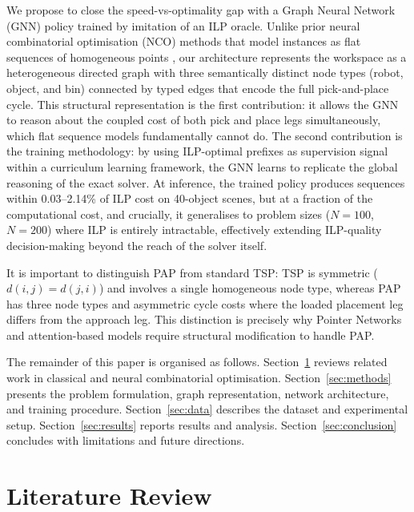 \documentclass[conference]{IEEEtran}
\begin{document}
We propose to close the speed-vs-optimality gap with a Graph Neural Network (GNN) policy trained by imitation of an ILP oracle. Unlike prior neural combinatorial optimisation (NCO) methods that model instances as flat sequences of homogeneous points \cite{vinyals2015pointer, kool2019attention}, our architecture represents the workspace as a heterogeneous directed graph with three semantically distinct node types (robot, object, and bin) connected by typed edges that encode the full pick-and-place cycle. This structural representation is the first contribution: it allows the GNN to reason about the coupled cost of both pick and place legs simultaneously, which flat sequence models fundamentally cannot do. The second contribution is the training methodology: by using ILP-optimal prefixes as supervision signal within a curriculum learning framework, the GNN learns to replicate the global reasoning of the exact solver. At inference, the trained policy produces sequences within 0.03--2.14\% of ILP cost on 40-object scenes, but at a fraction of the computational cost, and crucially, it generalises to problem sizes ($N{=}100$, $N{=}200$) where ILP is entirely intractable, effectively extending ILP-quality decision-making beyond the reach of the solver itself.

It is important to distinguish PAP from standard TSP: TSP is symmetric ($d(i,j)=d(j,i)$) and involves a single homogeneous node type, whereas PAP has three node types and asymmetric cycle costs where the loaded placement leg differs from the approach leg. This distinction is precisely why Pointer Networks \cite{vinyals2015pointer} and attention-based models \cite{kool2019attention} require structural modification to handle PAP.

The remainder of this paper is organised as follows. Section~\ref{sec:lit} reviews related work in classical and neural combinatorial optimisation. Section~\ref{sec:methods} presents the problem formulation, graph representation, network architecture, and training procedure. Section~\ref{sec:data} describes the dataset and experimental setup. Section~\ref{sec:results} reports results and analysis. Section~\ref{sec:conclusion} concludes with limitations and future directions.

\section{Literature Review}\label{sec:lit}
\end{document}
